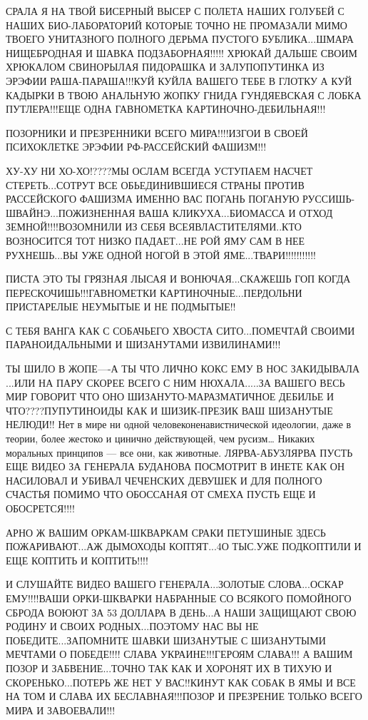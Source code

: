 СРАЛА Я НА ТВОЙ БИСЕРНЫЙ ВЫСЕР С ПОЛЕТА НАШИХ ГОЛУБЕЙ С НАШИХ БИО-ЛАБОРАТОРИЙ
КОТОРЫЕ ТОЧНО НЕ ПРОМАЗАЛИ МИМО ТВОЕГО УНИТАЗНОГО ПОЛНОГО ДЕРЬМА ПУСТОГО
БУБЛИКА...ШМАРА НИЩЕБРОДНАЯ И ШАВКА ПОДЗАБОРНАЯ!!!!! ХРЮКАЙ ДАЛЬШЕ СВОИМ
ХРЮКАЛОМ СВИНОРЫЛАЯ ПИДОРАШКА И ЗАЛУПОПУТИНКА ИЗ ЭРЭФИИ РАША-ПАРАША!!!КУЙ КУЙЛА
ВАШЕГО ТЕБЕ В ГЛОТКУ А КУЙ КАДЫРКИ В ТВОЮ АНАЛЬНУЮ ЖОПКУ ГНИДА ГУНДЯЕВСКАЯ С
ЛОБКА ПУТЛЕРА!!!ЕЩЕ ОДНА ГАВНОМЕТКА КАРТИНОЧНО-ДЕБИЛЬНАЯ!!!                                                  

ПОЗОРНИКИ И ПРЕЗРЕННИКИ ВСЕГО МИРА!!!!ИЗГОИ В СВОЕЙ ПСИХОКЛЕТКЕ ЭРЭФИИ
РФ-РАССЕЙСКИЙ ФАШИЗМ!!!

ХУ-ХУ НИ ХО-ХО!????МЫ ОСЛАМ ВСЕГДА УСТУПАЕМ НАСЧЕТ СТЕРЕТЬ...СОТРУТ ВСЕ
ОБЬЕДИНИВШИЕСЯ СТРАНЫ ПРОТИВ РАССЕЙСКОГО ФАШИЗМА ИМЕННО ВАС ПОГАНЬ ПОГАНУЮ
РУССИШЬ-ШВАЙНЭ...ПОЖИЗНЕННАЯ ВАША КЛИКУХА...БИОМАССА И ОТХОД
ЗЕМНОЙ!!!!ВОЗОМНИЛИ ИЗ СЕБЯ ВСЕЯВЛАСТИТЕЛЯМИ..КТО ВОЗНОСИТСЯ ТОТ НИЗКО
ПАДАЕТ...НЕ РОЙ ЯМУ САМ В НЕЕ РУХНЕШЬ...ВЫ УЖЕ ОДНОЙ НОГОЙ В ЭТОЙ
ЯМЕ...ТВАРИ!!!!!!!!!!!                       

ПИСТА ЭТО ТЫ ГРЯЗНАЯ ЛЫСАЯ И ВОНЮЧАЯ...СКАЖЕШЬ ГОП КОГДА
ПЕРЕСКОЧИШЬ!!!ГАВНОМЕТКИ КАРТИНОЧНЫЕ...ПЕРДОЛЬНИ ПРИСТАРЕЛЫЕ НЕУМЫТЫЕ И НЕ
ПОДМЫТЫЕ!!                       

С ТЕБЯ ВАНГА КАК С СОБАЧЬЕГО ХВОСТА СИТО...ПОМЕЧТАЙ СВОИМИ ПАРАНОИДАЛЬНЫМИ И
ШИЗАНУТАМИ ИЗВИЛИНАМИ!!!

ТЫ ШИЛО В ЖОПЕ----А ТЫ ЧТО ЛИЧНО КОКС ЕМУ В НОС ЗАКИДЫВАЛА ...ИЛИ НА ПАРУ
СКОРЕЕ ВСЕГО С НИМ НЮХАЛА.....ЗА ВАШЕГО ВЕСЬ МИР ГОВОРИТ ЧТО ОНО
ШИЗАНУТО-МАРАЗМАТИЧНОЕ ДЕБИЛЬЕ И ЧТО????ПУПУТИНОИДЫ КАК И ШИЗИК-ПРЕЗИК ВАШ
ШИЗАНУТЫЕ НЕЛЮДИ!!
Нет в мире ни одной человеконенавистнической идеологии, даже в теории, более
жестоко и цинично действующей, чем русизм… Никаких моральных принципов — все
они, как животные.
ЛЯРВА-АБУЗЛЯРВА ПУСТЬ ЕЩЕ ВИДЕО ЗА ГЕНЕРАЛА БУДАНОВА ПОСМОТРИТ В ИНЕТЕ КАК ОН
НАСИЛОВАЛ И УБИВАЛ ЧЕЧЕНСКИХ ДЕВУШЕК И ДЛЯ ПОЛНОГО СЧАСТЬЯ ПОМИМО ЧТО ОБОССАНАЯ
ОТ СМЕХА ПУСТЬ ЕЩЕ И ОБОСРЕТСЯ!!!!

АРНО Ж ВАШИМ ОРКАМ-ШКВАРКАМ СРАКИ  ПЕТУШИНЫЕ ЗДЕСЬ ПОЖАРИВАЮТ...АЖ ДЫМОХОДЫ
КОПТЯТ...4О ТЫС.УЖЕ ПОДКОПТИЛИ И ЕЩЕ КОПТИТЬ И КОПТИТЬ!!!!

И СЛУШАЙТЕ ВИДЕО ВАШЕГО ГЕНЕРАЛА...ЗОЛОТЫЕ СЛОВА...ОСКАР ЕМУ!!!!ВАШИ
ОРКИ-ШКВАРКИ НАБРАННЫЕ СО ВСЯКОГО ПОМОЙНОГО СБРОДА ВОЮЮТ ЗА 53 ДОЛЛАРА В
ДЕНЬ...А НАШИ ЗАЩИЩАЮТ СВОЮ РОДИНУ И СВОИХ РОДНЫХ...ПОЭТОМУ НАС ВЫ НЕ
ПОБЕДИТЕ...ЗАПОМНИТЕ ШАВКИ ШИЗАНУТЫЕ С ШИЗАНУТЫМИ МЕЧТАМИ О ПОБЕДЕ!!!! СЛАВА
УКРАИНЕ!!!ГЕРОЯМ СЛАВА!!! А ВАШИМ ПОЗОР И ЗАБВЕНИЕ...ТОЧНО ТАК КАК И ХОРОНЯТ ИХ
В ТИХУЮ И СКОРЕНЬКО...ПОТЕРЬ ЖЕ НЕТ У ВАС!!КИНУТ КАК СОБАК В ЯМЫ И ВСЕ НА ТОМ И
СЛАВА ИХ БЕСЛАВНАЯ!!!ПОЗОР  И ПРЕЗРЕНИЕ  ТОЛЬКО ВСЕГО МИРА И ЗАВОЕВАЛИ!!!

